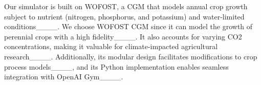 Our simulator is built on WOFOST, a CGM that models annual crop growth subject to nutrient (nitrogen, phosphorus, and potassium) and water-limited conditions____. We choose WOFOST CGM since it can model the growth of perennial crops with a high fidelity____. It also accounts for varying CO2 concentrations, making it valuable for climate-impacted agricultural research____. Additionally, its modular design facilitates modifications to crop process models____, and its Python implementation enables seamless integration with OpenAI Gym____.
